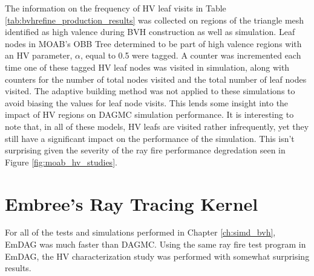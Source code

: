 The information on the frequency of HV leaf visits in Table
\ref{tab:bvhrefine_production_results} was collected on regions of the triangle
mesh identified as high valence during BVH construction as well as
simulation. Leaf nodes in MOAB's OBB Tree determined to be part of high valence
regions with an HV parameter, $\alpha$, equal to 0.5 were tagged. A counter was
incremented each time one of these tagged HV leaf nodes was visited in
simulation, along with counters for the number of total nodes visited and the
total number of leaf nodes visited. The adaptive building method was not applied
to these simulations to avoid biasing the values for leaf node visits. This
lends some insight into the impact of HV regions on DAGMC simulation
performance. It is interesting to note that, in all of these models, HV leafs are
visited rather infrequently, yet they still have a significant impact on the
performance of the simulation. This isn't surprising given the severity of the
ray fire performance degredation seen in Figure \ref{fig:moab_hv_studies}.

\section{Embree's Ray Tracing Kernel}\label{sec:emdag_hv_study}

For all of the tests and simulations performed in Chapter \ref{ch:simd_bvh},
EmDAG was much faster than DAGMC. Using the same ray fire test program in EmDAG,
the HV characterization study was performed with somewhat surprising results. 


